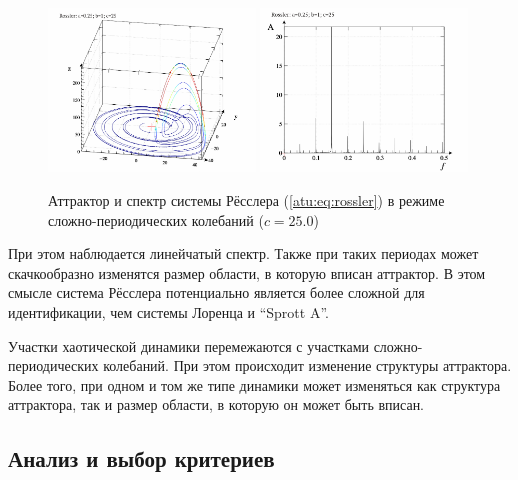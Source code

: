 \begin{figure}[ht!]
\begin{center}
  \includegraphics[width=0.49\textwidth]{p/cha/ross/ross0-p_xyz_c=25x00.png}
  \hfill
  \includegraphics[width=0.49\textwidth]{p/cha/ross/ross_f-p_f_c=25x00.png}
\end{center}
  \caption{Аттрактор и спектр системы Рёсслера (\ref{atu:eq:rossler}) в режиме сложно-периодических колебаний ($c=25.0$)}
\label{atu:f:ross_attractor_2500}
\end{figure}

При этом наблюдается линейчатый спектр. Также при
таких периодах может скачкообразно изменятся
размер области, в которую вписан аттрактор.
В этом смысле система Рёсслера потенциально является более сложной
для идентификации, чем системы Лоренца и ``Sprott A''.

Участки хаотической динамики перемежаются с участками сложно-периодических
колебаний. При этом происходит изменение структуры аттрактора.
Более того, при одном и том же типе динамики может изменяться как структура аттрактора,
так и размер области, в которую он может быть вписан.

%



\subsection{Анализ и выбор критериев}  %

